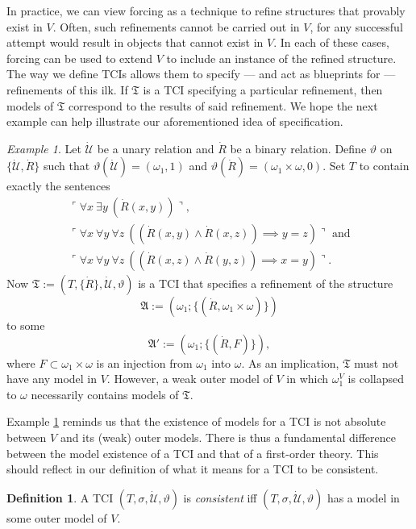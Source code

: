 \documentclass[12pt, twoside]{memoir}
\numberwithin{equation}{section}
\theoremstyle{definition}
\newtheorem{defi}[thm]{Definition}
\theoremstyle{remark}
\newtheorem{ex}[thm]{Example}
\theoremstyle{definition}
\theoremstyle{definition}
\theoremstyle{definition}
\theoremstyle{remark}
\begin{document}
In practice, we can view forcing as a technique to refine structures that provably exist in $V$. Often, such refinements cannot be carried out in $V$, for any successful attempt would result in objects that cannot exist in $V$. In each of these cases, forcing can be used to extend $V$ to include an instance of the refined structure. The way we define TCIs allows them to specify --- and act as blueprints for --- refinements of this ilk. If $\mathfrak{T}$ is a TCI specifying a particular refinement, then models of $\mathfrak{T}$ correspond to the results of said refinement. We hope the next example can help illustrate our aforementioned idea of specification.

\begin{ex}\label{3rdex}
Let $\dot{\mathcal{U}}$ be a unary relation and $\dot{R}$ be a binary relation. Define $\vartheta$ on $\{\dot{\mathcal{U}}, \dot{R}\}$ such that $\vartheta(\dot{\mathcal{U}}) = (\omega_1, 1)$ and $\vartheta(\dot{R}) = (\omega_1 \times \omega, 0)$. Set $T$ to contain exactly the sentences 
\begin{gather*}
    \ulcorner \forall x \ \exists y \ (\dot{R}(x, y)) \urcorner \text{,} \\
    \ulcorner \forall x \ \forall y \ \forall z \ ((\dot{R}(x, y) \wedge \dot{R}(x, z)) \implies y = z) \urcorner \text{ and} \\
    \ulcorner \forall x \ \forall y \ \forall z \ ((\dot{R}(x, z) \wedge \dot{R}(y, z)) \implies x = y) \urcorner \text{.}
\end{gather*}
Now $\mathfrak{T} := (T, \{\dot{R}\}, \dot{\mathcal{U}}, \vartheta)$ is a TCI that specifies a refinement of the structure $$\mathfrak{A} := (\omega_1; \{(\dot{R}, \omega_1 \times \omega)\})$$ to some $$\mathfrak{A}' := (\omega_1; \{(\dot{R}, F)\}),$$ where $F \subset \omega_1 \times \omega$ is an injection from $\omega_1$ into $\omega$. As an implication, $\mathfrak{T}$ must not have any model in $V$. However, a weak outer model of $V$ in which $\omega_1^V$ is collapsed to $\omega$ necessarily contains models of $\mathfrak{T}$.
\end{ex}

Example \ref{3rdex} reminds us that the existence of models for a TCI is not absolute between $V$ and its (weak) outer models. There is thus a fundamental difference between the model existence of a TCI and that of a first-order theory. This should reflect in our definition of what it means for a TCI to be consistent.

\begin{defi}
A TCI $(T, \sigma, \dot{\mathcal{U}}, \vartheta)$ is \emph{consistent} iff $(T, \sigma, \dot{\mathcal{U}}, \vartheta)$ has a model in some outer model of $V$. 
\end{defi}
\end{document}
